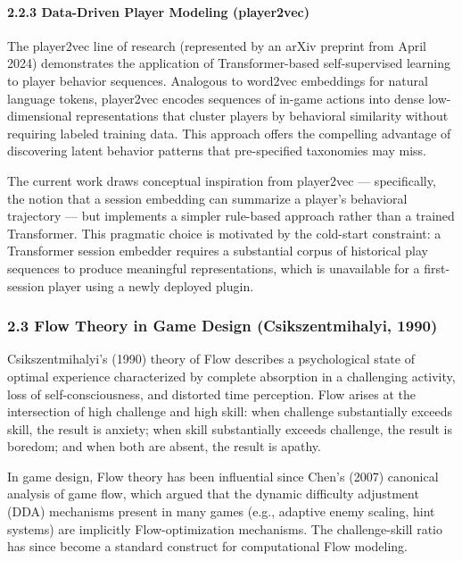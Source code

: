 \paragraph{2.2.3 Data-Driven Player Modeling
(player2vec)}\label{data-driven-player-modeling-player2vec}

The player2vec line of research (represented by an arXiv preprint from
April 2024) demonstrates the application of Transformer-based
self-supervised learning to player behavior sequences. Analogous to
word2vec embeddings for natural language tokens, player2vec encodes
sequences of in-game actions into dense low-dimensional representations
that cluster players by behavioral similarity without requiring labeled
training data. This approach offers the compelling advantage of
discovering latent behavior patterns that pre-specified taxonomies may
miss.

The current work draws conceptual inspiration from player2vec ---
specifically, the notion that a session embedding can summarize a
player's behavioral trajectory --- but implements a simpler rule-based
approach rather than a trained Transformer. This pragmatic choice is
motivated by the cold-start constraint: a Transformer session embedder
requires a substantial corpus of historical play sequences to produce
meaningful representations, which is unavailable for a first-session
player using a newly deployed plugin.

\subsubsection{2.3 Flow Theory in Game Design (Csikszentmihalyi,
1990)}\label{flow-theory-in-game-design-csikszentmihalyi-1990}

Csikszentmihalyi's (1990) theory of Flow describes a psychological state
of optimal experience characterized by complete absorption in a
challenging activity, loss of self-consciousness, and distorted time
perception. Flow arises at the intersection of high challenge and high
skill: when challenge substantially exceeds skill, the result is
anxiety; when skill substantially exceeds challenge, the result is
boredom; and when both are absent, the result is apathy.

In game design, Flow theory has been influential since Chen's (2007)
canonical analysis of game flow, which argued that the dynamic
difficulty adjustment (DDA) mechanisms present in many games (e.g.,
adaptive enemy scaling, hint systems) are implicitly Flow-optimization
mechanisms. The challenge-skill ratio has since become a standard
construct for computational Flow modeling.

